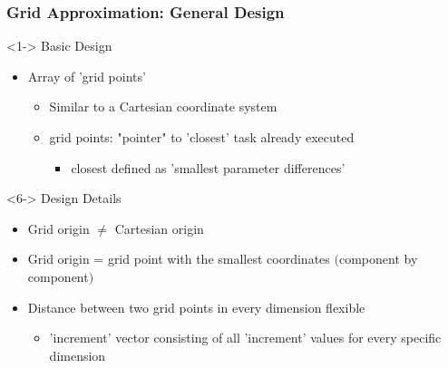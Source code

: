 \begin{frame}
	\frametitle{Grid Approximation: General Design}
	
		\begin{block}<1-> {Basic Design}
			\begin{itemize}
				\item<2-> {Array of 'grid points'}
					\begin{itemize}
						\item<3-> {Similar to a Cartesian coordinate system}
						\item<4->{grid points: "pointer" to 'closest' task already executed}
						\begin{itemize}
							\item<5-> {closest defined as 'smallest parameter differences'}	
						\end{itemize}
					\end{itemize}	
			\end{itemize}
		\end{block}
		
		\begin{block}<6-> {Design Details}
				\begin{itemize}
					\item<7-> {Grid origin $\neq$ Cartesian origin}
					\item<8-> {Grid origin = grid point with the  smallest coordinates $										($component by component$)$} 
					\item<9-> {Distance between two grid points in every dimension flexible}
						\begin{itemize}
							\item {'increment' vector consisting of all 'increment' values 											for every specific dimension}	
						\end{itemize}
				\end{itemize}
		\end{block}
\end{frame}

		
